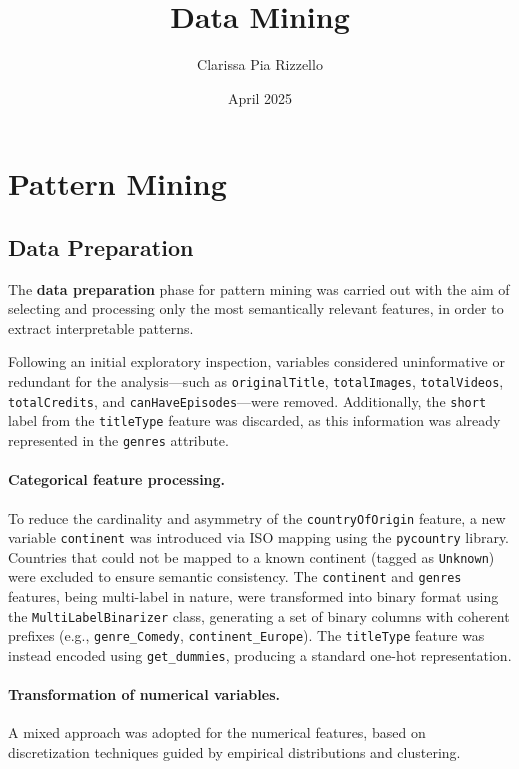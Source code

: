 \documentclass{article}
\title{Data Mining}
\author{Clarissa Pia Rizzello}
\date{April 2025}
\begin{document}
\maketitle
\newpage
\tableofcontents
\newpage


\section{Pattern Mining}

\subsection{Data Preparation}

The \textbf{data preparation} phase for pattern mining was carried out with the aim of selecting and processing only the most semantically relevant features, in order to extract interpretable patterns.

Following an initial exploratory inspection, variables considered uninformative or redundant for the analysis—such as \texttt{originalTitle}, \texttt{totalImages}, \texttt{totalVideos}, \texttt{totalCredits}, and \texttt{canHaveEpisodes}—were removed. Additionally, the \texttt{short} label from the \texttt{titleType} feature was discarded, as this information was already represented in the \texttt{genres} attribute.

\paragraph{Categorical feature processing.}
To reduce the cardinality and asymmetry of the \texttt{countryOfOrigin} feature, a new variable \texttt{continent} was introduced via ISO mapping using the \texttt{pycountry} library. Countries that could not be mapped to a known continent (tagged as \texttt{Unknown}) were excluded to ensure semantic consistency.  
The \texttt{continent} and \texttt{genres} features, being multi-label in nature, were transformed into binary format using the \texttt{MultiLabelBinarizer} class, generating a set of binary columns with coherent prefixes (e.g., \texttt{genre\_Comedy}, \texttt{continent\_Europe}).  
The \texttt{titleType} feature was instead encoded using \texttt{get\_dummies}, producing a standard one-hot representation.

\paragraph{Transformation of numerical variables.}
A mixed approach was adopted for the numerical features, based on discretization techniques guided by empirical distributions and clustering.
\end{document}
